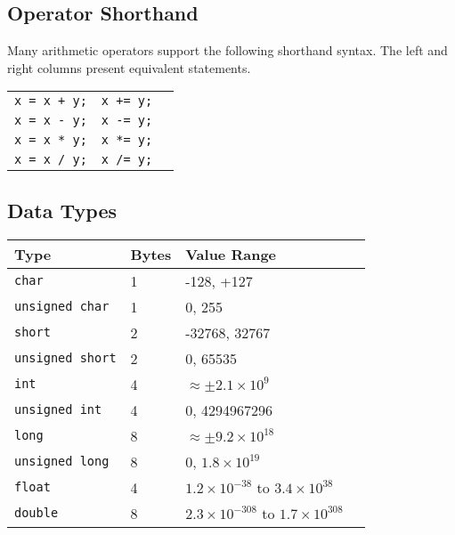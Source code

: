 \documentclass{lab}
\begin{document}
\begin{multicols}{2}
\columnbreak
\subsection{Operator Shorthand}

Many arithmetic operators support the following shorthand syntax. The left and right columns present equivalent statements.

\begin{table}[H]
\centering
\begin{tabular}{|c|c|c|}
\hline
\texttt{x = x + y;} & \texttt{x += y;} \\
\texttt{x = x - y;} & \texttt{x -= y;} \\
\texttt{x = x * y;} & \texttt{x *= y;} \\
\texttt{x = x / y;} & \texttt{x /= y;} \\
\hline
\end{tabular}
\end{table}

\subsection{Data Types}\label{sec:datatypes}

\begin{table}[H]
\begin{tabular}{|l|l|l|l|}
\hline
Type & Bytes & Value Range                             \\
\hline
\texttt{char}      & 1                  & -128, +127  \\
\texttt{unsigned char}	& 1				& 0, 255 \\
\texttt{short}     & 2                & -32768, 32767\\
\texttt{unsigned short} & 2			& 0, 65535 \\
\texttt{int}       & 4                & $\approx \pm 2.1\times 10^9$ \\
\texttt{unsigned int}	& 4				& 0, 4294967296 \\
\texttt{long}      & 8                  & $\approx \pm 9.2\times 10^{18}$ \\
\texttt{unsigned long} & 8				& 0, $1.8 \times 10^{19}$ \\
\texttt{float}       & 4  & $1.2\times 10^{-38}$ to $3.4 \times 10^{38}$    \\
\texttt{double}      & 8  & $2.3 \times 10^{-308}$ to $1.7 \times 10^{308}$    \\

\hline
\end{tabular}
\end{table}


\end{multicols}
\end{document}
